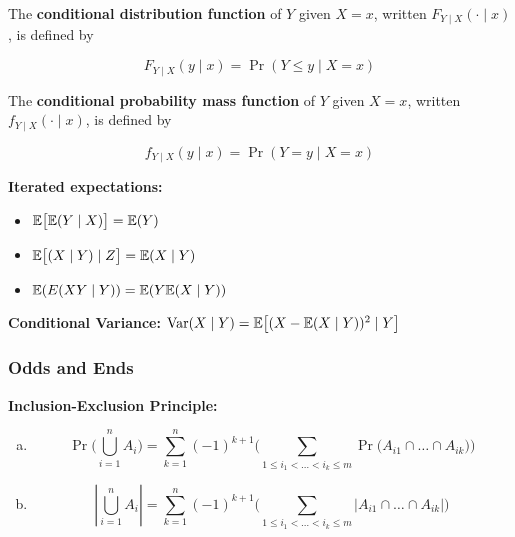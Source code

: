 \begin{definition}The \textbf{conditional distribution function} of \(Y\) given \(X = x\), written \(F_{Y\mid X}( \cdot \mid x)\), is defined by

\[
F_{Y\mid X}( y \mid x) = \Pr(Y \leq y \mid X = x)
\]
\end{definition}

\begin{definition}The \textbf{conditional probability mass function} of \(Y\) given \(X = x\), written \(f_{Y\mid X}( \cdot \mid x)\), is defined by

\[
f_{Y\mid X}( y \mid x) = \Pr(Y = y \mid X = x)
\]
\end{definition}

\begin{proposition}\textbf{Iterated expectations:} 

\begin{itemize}

\item \(\E\big[ \E(Y \mid X) \big] = \E(Y)\)

\item \(\E \big[ (X \mid Y) \mid Z \big] = \E(X \mid Y)\)

\item \( \E(E(XY \mid Y)) = \E(Y \E(X \mid Y))\)

\end{itemize}
\end{proposition}

\begin{definition} \textbf{Conditional Variance:} \(\Var(X \mid Y) = \E\big[ (X - \E(X \mid Y))^2   \mid Y\big]\)
\end{definition}

\subsubsection{Odds and Ends}

\begin{proposition} \label{prob.inex} \textbf{Inclusion-Exclusion Principle:}
\begin{enumerate}[(a)]

\item \[
\Pr \bigg( \bigcup_{i=1}^n A_i \bigg) = \sum_{k=1}^n (-1)^{k+1} \bigg( \sum_{1 \leq i_1 < \ldots < i_k \leq m} \Pr \big(A_{i1} \cap \ldots \cap A_{ik} \big) \bigg)
\]

\item \[
\left| \bigcup_{i=1}^n A_i \right| = \sum_{k=1}^n (-1)^{k+1} \bigg( \sum_{1 \leq i_1 < \ldots < i_k \leq m} \left| A_{i1} \cap \ldots \cap A_{ik} \right| \bigg)
\]
\end{enumerate}
\end{proposition}

